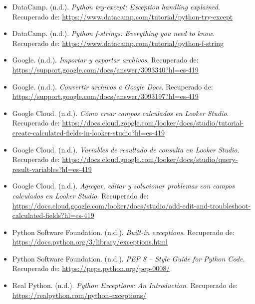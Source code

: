 \documentclass[12pt]{article}
\begin{document}
\begin{itemize}
    \item DataCamp. (n.d.). \textit{Python try-except: Exception handling explained}.  
    Recuperado de: \url{https://www.datacamp.com/tutorial/python-try-except}

    \item DataCamp. (n.d.). \textit{Python f-strings: Everything you need to know}.  
    Recuperado de: \url{https://www.datacamp.com/tutorial/python-f-string}

    \item Google. (n.d.). \textit{Importar y exportar archivos}.  
    Recuperado de: \url{https://support.google.com/docs/answer/3093340?hl=es-419}

    \item Google. (n.d.). \textit{Convertir archivos a Google Docs}.  
    Recuperado de: \url{https://support.google.com/docs/answer/3093197?hl=es-419}

    \item Google Cloud. (n.d.). \textit{Cómo crear campos calculados en Looker Studio}.  
    Recuperado de: \url{https://docs.cloud.google.com/looker/docs/studio/tutorial-create-calculated-fields-in-looker-studio?hl=es-419}

    \item Google Cloud. (n.d.). \textit{Variables de resultado de consulta en Looker Studio}.  
    Recuperado de: \url{https://docs.cloud.google.com/looker/docs/studio/query-result-variables?hl=es-419}

    \item Google Cloud. (n.d.). \textit{Agregar, editar y solucionar problemas con campos calculados en Looker Studio}.  
    Recuperado de: \url{https://docs.cloud.google.com/looker/docs/studio/add-edit-and-troubleshoot-calculated-fields?hl=es-419}

    \item Python Software Foundation. (n.d.). \textit{Built-in exceptions}.  
    Recuperado de: \url{https://docs.python.org/3/library/exceptions.html}

    \item Python Software Foundation. (n.d.). \textit{PEP 8 -- Style Guide for Python Code}.  
    Recuperado de: \url{https://peps.python.org/pep-0008/}

    \item Real Python. (n.d.). \textit{Python Exceptions: An Introduction}.  
    Recuperado de: \url{https://realpython.com/python-exceptions/}
\end{itemize}
\end{document}
